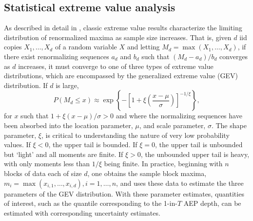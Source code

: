 \documentclass{ametsocV6.1}
\begin{document}
\subsection*{Statistical extreme value analysis}
\label{app:eva}

As described in detail in \citet{coles2001introduction}, classic extreme value results characterize the limiting distribution of renormalized maxima as sample size increases.
That is, given $d$ iid copies $X_{1}, \ldots, X_{d}$ of a random variable $X$ and letting $M_d = \max(X_1, \ldots, X_d)$, if there exist renormalizing sequences $a_d$ and $b_d$ such that $(M_d - a_d)/b_d$ converges as $d$ increases, it must converge to one of three types of extreme value distributions, which are encompassed by the generalized extreme value (GEV) distribution.
If $d$ is large, 
\begin{equation}
\label{eq:GEV}
P(M_d \leq x) \approx \exp
  \left\{ - \left[1 + \xi \left(\frac{x - \mu}{\sigma}\right) \right]^{-1/\xi} \right\},
\end{equation}
for $x$ such that $1 + \xi (x - \mu)/{\sigma} > 0$ and where the normalizing sequences have been absorbed into the location parameter, $\mu$, and scale parameter, $\sigma$. 
The shape parameter, $\xi$, is critical to understanding the nature of very low probability values.
If $\xi <0$, the upper tail is bounded. %
If $\xi = 0$, the upper tail is unbounded but `light' and all moments are finite.
If $\xi > 0$, the unbounded upper tail is heavy, with only moments less than $1/\xi$ being finite.
In practice, beginning with $n$ blocks of data each of size $d$,  one obtains the sample block maxima, $m_i = \max(x_{i,1}, \ldots, x_{i,d}), i = 1, \ldots, n$, and uses these data to estimate the three parameters of the GEV distribution.
With these parameter estimates, quantities of interest, such as the quantile corresponding to the 1-in-$T$ AEP depth, can be estimated with corresponding uncertainty estimates.
\end{document}
